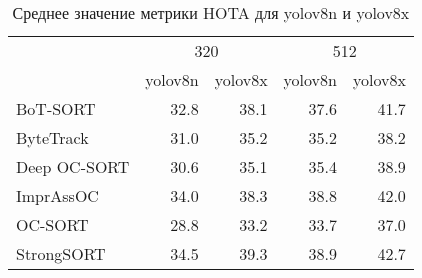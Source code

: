 \begin{table}[htbp]

\caption{Среднее значение метрики HOTA для yolov8n и yolov8x}
\label{tab:mean_hota_yolo_size}
\centering
\begin{tabular}{lrrrr}
 & \multicolumn{2}{c}{320} & \multicolumn{2}{c}{512} \\
  & yolov8n & yolov8x & yolov8n & yolov8x \\
\midrule
BoT-SORT & 32.8 & 38.1 & 37.6 & 41.7 \\
ByteTrack & 31.0 & 35.2 & 35.2 & 38.2 \\
Deep OC-SORT & 30.6 & 35.1 & 35.4 & 38.9 \\
ImprAssOC & 34.0 & 38.3 & 38.8 & 42.0 \\
OC-SORT & 28.8 & 33.2 & 33.7 & 37.0 \\
StrongSORT & 34.5 & 39.3 & 38.9 & 42.7 \\
\bottomrule
\end{tabular}\end{table}